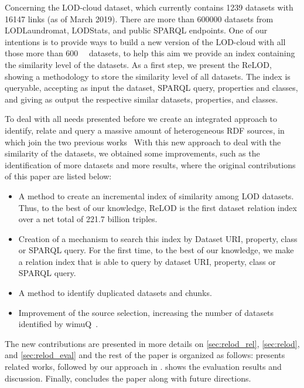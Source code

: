 \documentclass[sw]{iosart2x}
\begin{document}
Concerning the LOD-cloud dataset, which currently contains \num{1239} datasets with \num{16147} links (as of March 2019)\cite{lodcloud}. There are more than \num{600000} datasets from LODLaundromat, LODStats, and public SPARQL endpoints. One of our intentions is to provide ways to build a new version of the LOD-cloud with all those more than \SI{600}{\kilo\nothing} datasets, to help this aim we provide an index containing the similarity level of the datasets. As a first step, we present the ReLOD, showing a methodology to store the similarity level of all datasets. The index is queryable, accepting as input the dataset, SPARQL query, properties and classes, and giving as output the respective similar datasets, properties, and classes.

To deal with all needs presented before we create an integrated approach to identify, relate and query a massive amount of heterogeneous RDF sources, in which join the two previous works~\cite{valdestilhas2018my, valdestilhas2019more} 
With this new approach to deal with the similarity of the datasets, we obtained some improvements, such as the identification of more datasets and more results, where the original contributions of this paper are listed below:
\begin{itemize}
    \item A method to create an incremental index of similarity among LOD datasets. Thus, to the best of our knowledge, ReLOD is the first dataset relation index over a net total of 221.7 billion triples.
    \item Creation of a mechanism to search this index by Dataset URI, property, class or SPARQL query. For the first time, to the best of our knowledge, we make a relation index that is able to query by dataset URI, property, class or SPARQL query.
    \item A method to identify duplicated datasets and chunks.
    \item Improvement of the source selection, increasing the number of datasets identified by wimuQ~\cite{valdestilhas2019more}.
\end{itemize}

The new contributions are presented in more details on \cref{sec:relod_rel}, \cref{sec:relod}, and \cref{sec:relod_eval} and the rest of the paper is organized as follows:
 presents related works, followed by our approach in .  shows the evaluation results and discussion. Finally,  concludes the paper along with future directions.
\end{document}
